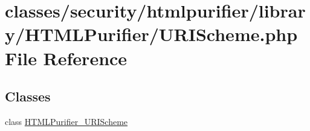 \hypertarget{URIScheme_8php}{\section{classes/security/htmlpurifier/library/\+H\+T\+M\+L\+Purifier/\+U\+R\+I\+Scheme.php File Reference}
\label{URIScheme_8php}
}
\subsection*{Classes}
\begin{DoxyCompactItemize}
\item 
class \hyperlink{classHTMLPurifier__URIScheme}{H\+T\+M\+L\+Purifier\+\_\+\+U\+R\+I\+Scheme}
\end{DoxyCompactItemize}
